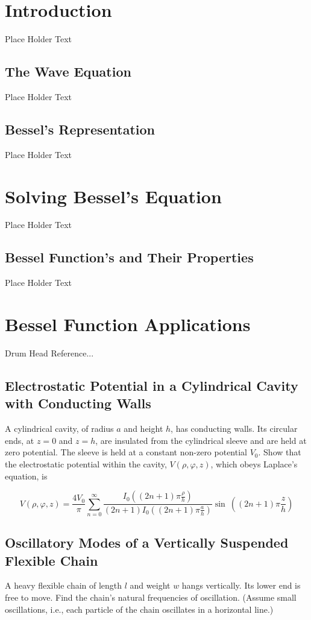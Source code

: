 \documentclass[aip,graphicx,amsmath,amssymb,reprint]{revtex4-1}
\newenvironment{smallequation}{\footnotesize\begin{equation}}{\end{equation}\quad}
\begin{document}
\section{Introduction}
Place Holder Text
\subsection{The Wave Equation}
Place Holder Text
\subsection{Bessel's Representation}
Place Holder Text

\section{Solving Bessel’s Equation}
Place Holder Text
\subsection{Bessel Function's and Their Properties}
Place Holder Text

\section{Bessel Function Applications}
Drum Head Reference...
\subsection{Electrostatic Potential in a Cylindrical Cavity with Conducting Walls}
A cylindrical cavity, of radius \(a\) and height \(h\), has conducting walls. Its circular ends,
at \(z = 0\) and \(z = h\), are insulated from the cylindrical sleeve and are held at zero potential. The sleeve is held at a constant non-zero potential \(V_{0}\). Show that the electrostatic potential within the cavity, \(V \left(\rho, \varphi, z\right)\), which obeys Laplace’s equation, is

\begin{smallequation}
\label{eq:Electrostatic_Potential_Laplace_Form}
     V \left(\rho, \varphi, z\right) = \frac{4 V_{0}}{\pi} \sum^{\infty}_{n = 0} \frac{I_{0}\left( \left(2n + 1\right)\pi \frac{\rho}{h} \right)}{\left(2n + 1\right) I_{0}\left( \left(2n + 1\right)\pi \frac{a}{h} \right)} \sin \ {\left( \left(2n + 1\right)\pi \frac{z}{h} \right)}
\end{smallequation}

\subsection{Oscillatory Modes of a Vertically Suspended Flexible Chain}
A heavy flexible chain of length \(l\) and weight \(w\) hangs vertically. Its lower end is free
to move. Find the chain’s natural frequencies of oscillation. (Assume small oscillations, i.e., each
particle of the chain oscillates in a horizontal line.)
\end{document}
